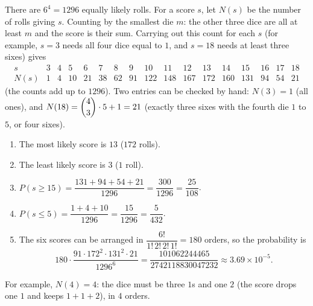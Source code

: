 There are $6^4=1296$ equally likely rolls. For a score $s$, let $N(s)$ be the number of rolls giving $s$. Counting by the smallest die $m$: the other three dice are all at least $m$ and the score is their sum. Carrying out this count for each $s$ (for example, $s=3$ needs all four dice equal to $1$, and $s=18$ needs at least three sixes) gives
\[
\begin{array}{c|cccccccccccccccc}
s&3&4&5&6&7&8&9&10&11&12&13&14&15&16&17&18\\ \hline
N(s)&1&4&10&21&38&62&91&122&148&167&172&160&131&94&54&21
\end{array}
\]
(the counts add up to $1296$). Two entries can be checked by hand: $N(3)=1$ (all ones), and $N(18)=\dbinom43\cdot5+1=21$ (exactly three sixes with the fourth die $1$ to $5$, or four sixes).
\begin{enumerate}
\item The most likely score is $\boxed{13}$ ($172$ rolls).
\item The least likely score is $\boxed{3}$ ($1$ roll).
\item $P(s\ge15)=\dfrac{131+94+54+21}{1296}=\dfrac{300}{1296}=\boxed{\dfrac{25}{108}}$.
\item $P(s\le5)=\dfrac{1+4+10}{1296}=\dfrac{15}{1296}=\boxed{\dfrac{5}{432}}$.
\item The six scores can be arranged in $\dfrac{6!}{1!\,2!\,2!\,1!}=180$ orders, so the probability is
\[
180\cdot\dfrac{91\cdot172^2\cdot131^2\cdot21}{1296^6}=\boxed{\dfrac{101062244465}{2742118830047232}}\approx3.69\times10^{-5}.
\]
\end{enumerate}
For example, $N(4)=4$: the dice must be three $1$s and one $2$ (the score drops one $1$ and keeps $1+1+2$), in $4$ orders.
